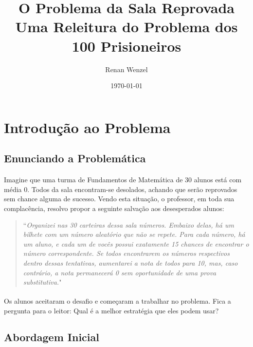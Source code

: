 \documentclass{article}
\title{\textbf{O Problema da Sala Reprovada}\\ \large Uma Releitura do Problema dos 100 Prisioneiros}
\author{Renan Wenzel}
\date{\today}
\begin{document}
    \maketitle
    \newpage  
    
    \tableofcontents
    
    \newpage
    \section{Introdu\c c\~ao ao Problema}
    \subsection{Enunciando a Problem\'atica}
        \paragraph{}Imagine que uma turma de Fundamentos de Matem\'atica de 30 alunos est\'a com m\'edia 0. Todos da sala encontram-se desolados, achando que ser\~ao
        reprovados sem chance alguma de sucesso. Vendo esta situa\c c\~ao, o professor, em toda sua complac\^encia, resolvo propor a seguinte salva\c c\~ao aos desesperados 
        alunos:
        \begin{quote}
            ``\textit{Organizei nas 30 carteiras dessa sala n\'umeros. Embaixo delas, h\'a um bilhete com um n\'umero aleat\'orio que n\~ao se repete. Para cada n\'umero, 
            h\'a um aluno, e cada um de voc\^es possui exatamente 15 chances de encontrar o n\'umero correspondente. Se todos encontrarem os n\'umeros respectivos dentro 
            dessas tentativas, aumentarei a nota de todos para 10, mas, caso contr\'ario, a nota permanecer\'a 0 sem oportunidade de uma prova substitutiva.}"
        \end{quote}
        \paragraph{}Os alunos aceitaram o desafio e come\c caram a trabalhar no problema. Fica a pergunta para o leitor: Qual \'e a melhor estrat\'egia que eles podem usar?
    \subsection{Abordagem Inicial}
\end{document}
